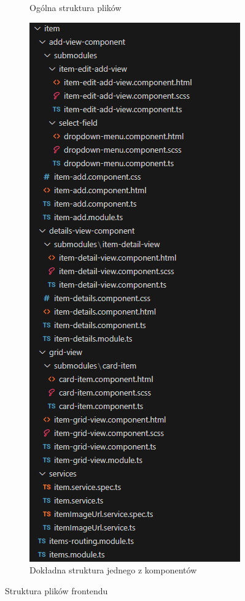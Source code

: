 \documentclass[../../main.tex]{subfiles}
\begin{document}
\begin{figure}[ht!]
\begin{subfigure}{.5\textwidth}
                \caption{Ogólna struktura plików}
                \label{fig:front-repo-structure-general}
            \end{subfigure}
            \begin{subfigure}{.5\textwidth}
                \centering
                \includegraphics[height=0.4\pdfpageheight]{images/frontend-repo-structure-feature.png}
                \caption{Dokładna struktura jednego z komponentów}
                \label{fig:front-repo-structure-feature}
            \end{subfigure}
            \caption{Struktura plików frontendu}
            \label{fig:frontend-repo-structure}
        \end{figure}
    
\end{document}

